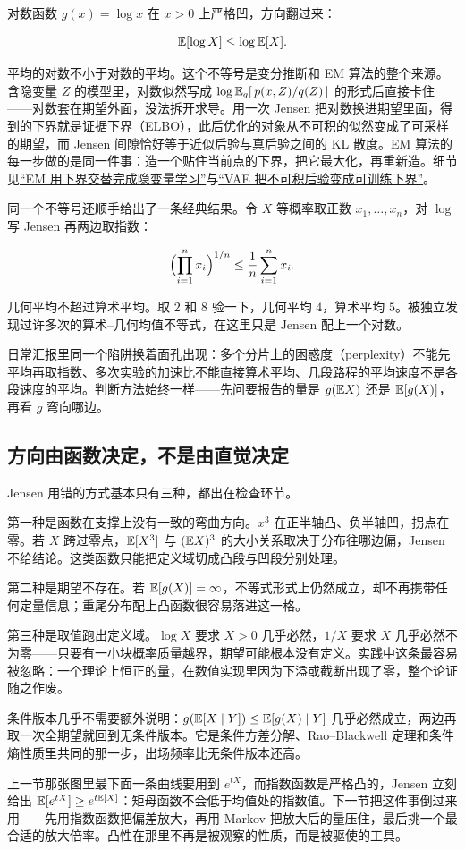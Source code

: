 对数函数 \(g(x)=\log x\) 在 \(x>0\) 上严格凹，方向翻过来：

\[
\mathbb{E}[\log X]\le\log\mathbb{E}[X].
\]

平均的对数不小于对数的平均。这个不等号是变分推断和 EM 算法的整个来源。含隐变量 \(Z\) 的模型里，对数似然写成 \(\log\mathbb{E}_{q}[\,p(x,Z)/q(Z)\,]\) 的形式后直接卡住——对数套在期望外面，没法拆开求导。用一次 Jensen 把对数换进期望里面，得到的下界就是证据下界（ELBO），此后优化的对象从不可积的似然变成了可采样的期望，而 Jensen 间隙恰好等于近似后验与真后验之间的 KL 散度。EM 算法的每一步做的是同一件事：造一个贴住当前点的下界，把它最大化，再重新造。细节见\hyperref[sec:13-Machine-Learning/06-Probabilistic-Models/04]{``EM 用下界交替完成隐变量学习''}与\hyperref[sec:14-Deep-Learning/06-Variational-Autoencoders/01]{``VAE 把不可积后验变成可训练下界''}。

同一个不等号还顺手给出了一条经典结果。令 \(X\) 等概率取正数 \(x_1,\ldots,x_n\)，对 \(\log\) 写 Jensen 再两边取指数：

\[
\Bigl(\prod_{i=1}^nx_i\Bigr)^{1/n}\le\frac1n\sum_{i=1}^nx_i.
\]

几何平均不超过算术平均。取 \(2\) 和 \(8\) 验一下，几何平均 \(4\)，算术平均 \(5\)。被独立发现过许多次的算术--几何均值不等式，在这里只是 Jensen 配上一个对数。

日常汇报里同一个陷阱换着面孔出现：多个分片上的困惑度（perplexity）不能先平均再取指数、多次实验的加速比不能直接算术平均、几段路程的平均速度不是各段速度的平均。判断方法始终一样——先问要报告的量是 \(g(\mathbb{E} X)\) 还是 \(\mathbb{E}[g(X)]\)，再看 \(g\) 弯向哪边。

\subsection{方向由函数决定，不是由直觉决定}

Jensen 用错的方式基本只有三种，都出在检查环节。

第一种是函数在支撑上没有一致的弯曲方向。\(x^3\) 在正半轴凸、负半轴凹，拐点在零。若 \(X\) 跨过零点，\(\mathbb{E}[X^3]\) 与 \((\mathbb{E} X)^3\) 的大小关系取决于分布往哪边偏，Jensen 不给结论。这类函数只能把定义域切成凸段与凹段分别处理。

第二种是期望不存在。若 \(\mathbb{E}[g(X)]=\infty\)，不等式形式上仍然成立，却不再携带任何定量信息；重尾分布配上凸函数很容易落进这一格。

第三种是取值跑出定义域。\(\log X\) 要求 \(X>0\) 几乎必然，\(1/X\) 要求 \(X\) 几乎必然不为零——只要有一小块概率质量越界，期望可能根本没有定义。实践中这条最容易被忽略：一个理论上恒正的量，在数值实现里因为下溢或截断出现了零，整个论证随之作废。

条件版本几乎不需要额外说明：\(g(\mathbb{E}[X\mid Y])\le\mathbb{E}[g(X)\mid Y]\) 几乎必然成立，两边再取一次全期望就回到无条件版本。它是条件方差分解、Rao--Blackwell 定理和条件熵性质里共同的那一步，出场频率比无条件版本还高。

上一节那张图里最下面一条曲线要用到 \(e^{tX}\)，而指数函数是严格凸的，Jensen 立刻给出 \(\mathbb{E}[e^{tX}]\ge e^{t\mathbb{E}[X]}\)：矩母函数不会低于均值处的指数值。下一节把这件事倒过来用——先用指数函数把偏差放大，再用 Markov 把放大后的量压住，最后挑一个最合适的放大倍率。凸性在那里不再是被观察的性质，而是被驱使的工具。
